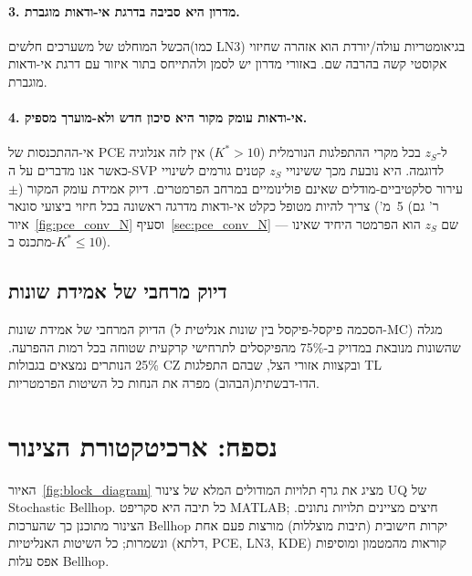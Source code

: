 \documentclass[12pt,a4paper]{article}
\begin{document}
\paragraph{3. מדרון היא סביבה  בדרגת אי-ודאות מוגברת.}
הכשל המוחלט של משערכים חלשים(כמו LN3) בגיאומטריות עולה/יורדת הוא אזהרה
שחיזוי אקוסטי קשה בהרבה שם.
 באזורי מדרון יש לסמן ולהתייחס בתור איזור עם דרגת אי-ודאות מוגברת.

\paragraph{4. אי-ודאות עומק מקור היא סיכון חדש ולא-מוערך מספיק.}
אי-ההתכנסות של \textenglish{PCE} ל-$z_S$ בכל מקרי ההתפלגות הנורמלית ($K^*>10$)
אין לזה  אנלוגיה כאשר אנו מדברים על ה-SVP לדוגמה.
היא נובעת מכך ששינויי $z_S$ קטנים גורמים לשינויי עירור סלקטיביים-מודלים
שאינם פולינומיים במרחב הפרמטרים.
דיוק אמידת עומק המקור ($\pm$5~מ') צריך להיות מטופל כקלט אי-ודאות מדרגה ראשונה
בכל חיזוי ביצועי סונאר (ר' גם איור~\ref{fig:pce_conv_N} וסעיף~\ref{sec:pce_conv_N} — שם $z_S$ הוא הפרמטר היחיד שאינו מתכנס ב-$K^*\leq10$).

\subsection{דיוק מרחבי של אמידת שונות}
\label{sec:spatial_accuracy}

הדיוק המרחבי של אמידת שונות (הסכמה פיקסל-פיקסל בין שונות אנליטית ל-MC)
מגלה שהשונות מנובאת במדויק ב-75\%{} מהפיקסלים לתרחישי קרקעית שטוחה בכל רמות ההפרעה.
25\%{} הנותרים נמצאים בגבולות CZ ובקצוות אזורי הצל,
שבהם התפלגות TL הדו-דבשתית(הבהוב) מפרה את הנחות כל השיטות הפרמטריות.

\section*{נספח: ארכיטקטורת הצינור}
\label{sec:appendix}

האיור~\ref{fig:block_diagram} מציג את גרף תלויות המודולים המלא של צינור UQ
של \textenglish{Stochastic Bellhop}.
כל תיבה היא סקריפט \textenglish{MATLAB}; חיצים מציינים תלויות נתונים.
הצינור מתוכנן כך שהערכות \textenglish{Bellhop} יקרות חישובית (תיבות מוצללות)
מורצות פעם אחת ונשמרות; כל השיטות האנליטיות (דלתא, \textenglish{PCE}, \textenglish{LN3}, \textenglish{KDE})
קוראות מהמטמון ומוסיפות אפס עלות \textenglish{Bellhop}.
\end{document}
